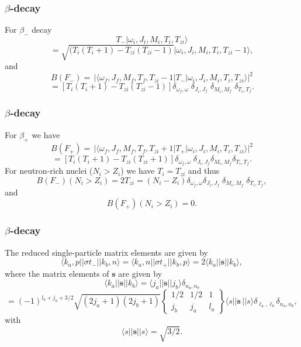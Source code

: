 \documentclass{beamer}
\begin{document}
\begin{frame}
\frametitle{$\beta$-decay}

\begin{block}{}
For $\beta_{-}$ decay
\[
T_{-}\vert \omega _{i},J_{i},M_{i},T_{i},T_{zi}\rangle
\]
\[
= \sqrt{(T_{i}(T_{i}+1)-T_{zi}(T_{zi}-1)}\vert \omega _{i},J_{i},M_{i},T_{i},T_{zi}-1\rangle,      
\]
and
\[
B(F_{-}) =\, \vert \langle \omega _{f},J_{f},M_{f},T_{f},T_{zi}-1\vert T_{-}\vert \omega 
_{i},J_{i},M_{i},T_{i},T_{zi}\rangle\vert ^{2}
\]
\[
= [T_{i}(T_{i}+1)-T_{zi}(T_{zi}-1)]
\delta _{\omega _{f},\omega }\;\delta _{J_{i},J_{f}}\;\delta _{M_{i},M_{f}}\;\delta _{T_{i},T_{f}}. 
\]
\end{block}
\end{frame}

\begin{frame}
\frametitle{$\beta$-decay}

\begin{block}{}
For $\beta_{ + }$ we have
\[
B(F_{+}) =\, \vert \langle \omega _{f},J_{f},M_{f},T_{f},T_{zi}+1\vert T_{+}\vert \omega 
_{i},J_{i},M_{i},T_{i},T_{zi}\rangle\vert ^{2}
\]
\[
= [T_{i}(T_{i}+1)-T_{zi}(T_{zi}+1)]
\delta _{\omega _{f},\omega }\;\delta _{J_{i},J_{f}}\delta _{M_{i},M_{f}}\delta _{T_{i},T_{f}}. 
\]
For neutron-rich nuclei ($N_{i}> Z_{i}$) we have $T_{i}=T_{zi}$ and thus
\[
B(F_{-})(N_{i}> Z_{i}) = 2T_{zi} = (N_{i}-Z_{i})\delta _{\omega _{f},\omega }\delta _{J_{i},J_{f}}\;\delta _{M_{i},M_{f}}\;\delta _{T_{i},T_{f}}, 
\]
and
\[
B(F_{+})(N_{i}> Z_{i}) = 0. 
\]
\end{block}
\end{frame}

\begin{frame}
\frametitle{$\beta$-decay}

\begin{block}{}
The reduced single-particle
matrix elements are given by
\[
\langle k_{a},p\vert\vert \sigma  t_{-}\vert\vert k_{b},n\rangle=\langle k_{a},n\vert\vert \sigma  t_{+}\vert\vert k_{b},p\rangle= 2\langle k_{a}\vert\vert \mathbf{s}\vert\vert k_{b}\rangle, 
\]
where the matrix elements of $\mathbf{s}$ are given by
\[
\langle k_{a}\vert\vert \mathbf{s}\vert\vert k_{b}\rangle=\langle j_{a}\vert\vert \mathbf{s}\vert\vert j_{b}\rangle \delta_{n_{a},n_{b}}
\]
\[
=(-1)^{l_{a}+j_{a}+3/2}
\sqrt{(2j_{a}+1)(2j_{b}+1)}\left\{\begin{array}{ccc}  {1/2}&  {1/2}&  {1} \\ {j_{b}}&  {j_{a}}&  {l_{a}}\end{array}\right\}
\langle s\vert\vert \mathbf{s}\,\vert\vert s\rangle \delta _{\ell _{a},\ell _{b}} \delta_{n_{a},n_{b}}
,
\]
with
\[
\langle s\vert\vert \mathbf{s}\vert\vert s\rangle= \sqrt{3/2}.
\]
\end{block}
\end{frame}
\end{document}
